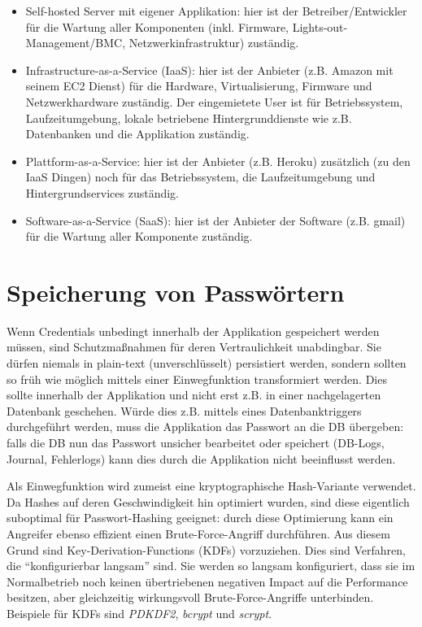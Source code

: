 \begin{itemize}
	\item Self-hosted Server mit eigener Applikation: hier ist der Betreiber/Entwickler für die Wartung aller Komponenten (inkl. Firmware, Lights-out-Management/BMC, Netzwerkinfrastruktur) zuständig.
	\item Infrastructure-as-a-Service (IaaS): hier ist der Anbieter (z.B. Amazon mit seinem EC2 Dienst) für die Hardware, Virtualisierung, Firmware und Netzwerkhardware zuständig. Der eingemietete User ist für Betriebssystem, Laufzeitumgebung, lokale betriebene Hintergrunddienste wie z.B. Datenbanken und die Applikation zuständig.
	\item Plattform-as-a-Service: hier ist der Anbieter (z.B. Heroku) zusätzlich (zu den IaaS Dingen) noch für das Betriebssystem, die Laufzeitumgebung und Hintergrundservices zuständig.
	\item Software-as-a-Service (SaaS): hier ist der Anbieter der Software (z.B. gmail) für die Wartung aller Komponente zuständig.
\end{itemize}

\section{Speicherung von Passwörtern}
\label{password_storage}

Wenn Credentials unbedingt innerhalb der Applikation gespeichert werden müssen, sind Schutzmaßnahmen für deren Vertraulichkeit unabdingbar. Sie dürfen niemals in plain-text (unverschlüsselt) persistiert werden, sondern sollten so früh wie möglich mittels einer Einwegfunktion transformiert werden. Dies sollte innerhalb der Applikation und nicht erst z.B. in einer nachgelagerten Datenbank geschehen. Würde dies z.B. mittels eines Datenbanktriggers durchgeführt werden, muss die Applikation das Passwort an die DB übergeben: falls die DB nun das Passwort unsicher bearbeitet oder speichert (DB-Logs, Journal, Fehlerlogs) kann dies durch die Applikation nicht beeinflusst werden.

Als Einwegfunktion wird zumeist eine kryptographische Hash-Variante verwendet. Da Hashes auf deren Geschwindigkeit hin optimiert wurden, sind diese eigentlich suboptimal für Passwort-Hashing geeignet: durch diese Optimierung kann ein Angreifer ebenso effizient einen Brute-Force-Angriff durchführen. Aus diesem Grund sind Key-Derivation-Functions (KDFs) vorzuziehen. Dies sind Verfahren, die ``konfigurierbar langsam'' sind. Sie werden so langsam konfiguriert, dass sie im Normalbetrieb noch keinen übertriebenen negativen Impact auf die Performance besitzen, aber gleichzeitig wirkungsvoll Brute-Force-Angriffe unterbinden. Beispiele für KDFs sind \textit{PDKDF2}, \textit{bcrypt} und \textit{scrypt}.

